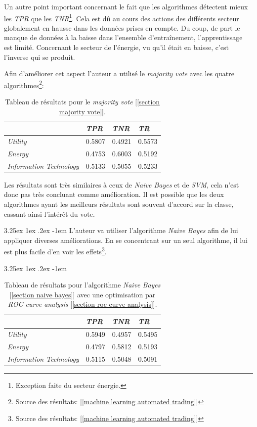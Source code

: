 \documentclass[a4paper, 11pt]{article}
\makeatletter
\renewcommand\paragraph{\@startsection{paragraph}{5}{\z@}%
  {3.25ex \@plus1ex \@minus.2ex}%
  {-1em}%
  {\normalfont\normalsize\bfseries}}
\makeatother
\begin{document}
Un autre point important concernant le fait que les algorithmes détectent mieux les \textit{TPR} que les \textit{TNR}\footnote{Exception faite du secteur énergie.}. Cela est dû au cours des actions des différents secteur globalement en hausse dans les données prises en compte. Du coup, de part le manque de données à la baisse dans l'ensemble d'entraînement, l'apprentissage est limité. Concernant le secteur de l'énergie, vu qu'il était en baisse, c'est l'inverse qui se produit.

Afin d'améliorer cet aspect l'auteur a utilisé le \textit{majority vote} avec les quatre algorithmes\footnote{Source des résultats: [\ref{machine learning automated trading}]}:

\begin{table}[h!]
	\centering
\begin{tabular}{|l|l|l|l|}
	\hline
	\ & \textit{TPR} & \textit{TNR} & \textit{TR}\\
	\hline
	\textit{Utility} & 0.5807 & 0.4921 & 0.5573 \\
	\hline
	\textit{Energy} & 0.4753 & 0.6003 & 0.5192\\
	\hline
	\textit{Information Technology} & 0.5133 & 0.5055 & 0.5233\\
	\hline
\end{tabular}
\caption{Tableau de résultats pour le \textit{majority vote} [\ref{section majority vote}].}
\end{table}

Les résultats sont très similaires à ceux de \textit{Naive Bayes} et de \textit{SVM}, cela n'est donc pas très concluant comme amélioration. Il est possible que les deux algorithmes ayant les meilleurs résultats sont souvent d'accord sur la classe, cassant ainsi l'intérêt du vote.

\paragraph{}
L'auteur va utiliser l'algorithme \textit{Naive Bayes} afin de lui appliquer diverses améliorations. En se concentrant sur un seul algorithme, il lui est plus facile d'en voir les effets\footnote{Source des résultats: [\ref{machine learning automated trading}]}.

\paragraph{}
\begin{table}[h!]
	\centering
\begin{tabular}{|l|l|l|l|}
	\hline
	\ & \textit{TPR} & \textit{TNR} & \textit{TR}\\
	\hline
	\textit{Utility} & 0.5949 & 0.4957 & 0.5495 \\
	\hline
	\textit{Energy} & 0.4797 & 0.5812 & 0.5193\\
	\hline
	\textit{Information Technology} & 0.5115 & 0.5048 & 0.5091\\
	\hline
\end{tabular}
\caption{Tableau de résultats pour l'algorithme \textit{Naive Bayes} [\ref{section naive bayes}] avec une optimisation par \textit{ROC curve analysis} [\ref{section roc curve analysis}].}
\end{table}
\end{document}
